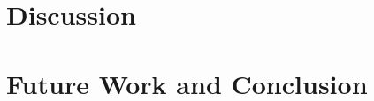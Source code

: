\documentclass[conference]{IEEEtran}
\begin{document}


\section{Discussion \label{discussion}}

\section{Future Work and Conclusion \label{conclusion}}



%
%

\end{document}
